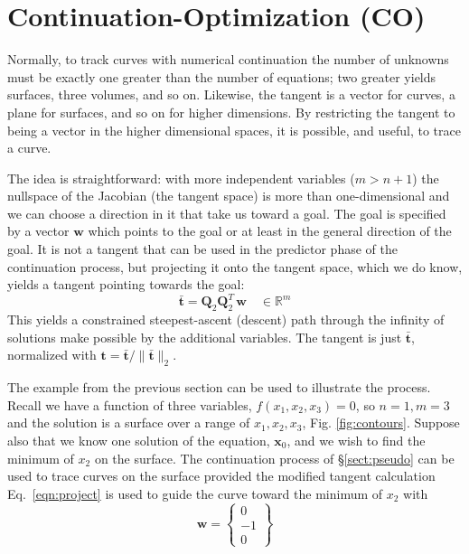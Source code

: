 \documentclass[10pt,openany,twoside]{book}
\numberwithin{equation}{section}   %
\newcommand{\Matrix}[1]{\boldsymbol{#1}}
\newcommand{\Vector}[1]{\boldsymbol{#1}}
\newcommand{\Sectref}[1]{\S\ref{#1}}
\newcommand{\Eqn}[1]{Eq.\ \ref{#1}}
\newcommand{\Figref}[1]{Fig. \ref{#1}}
\begin{document}
\section{Continuation-Optimization (CO)}\label{sect:CO}
Normally, to track curves with numerical continuation the number of unknowns
must be exactly one greater than the number of equations; two greater
yields surfaces, three volumes, and so on. Likewise, the tangent is a
vector for curves, a plane for surfaces, and so on for higher dimensions.
By restricting the tangent to being a vector in the higher dimensional
spaces, it is possible, and useful, to trace a curve.

The idea is straightforward: with more independent variables ($m > n+1$)
the nullspace of the Jacobian (the tangent space) is more than
one-dimensional and we can choose a direction in it that take us
toward a goal. The goal is specified by a vector $\Vector{w}$ which
points to the goal or at least in the general direction of the goal. 
It is not a tangent that can be used in the predictor phase of the
continuation process, but projecting it onto the tangent space, which
we do know, yields a tangent pointing towards the goal:
\begin{equation} \label{eqn:project}
\bar{\Vector{t}} = \Matrix{Q}_2\Matrix{Q}_2^T\,\Vector{w} \quad \in \mathbb{R}^m
\end{equation}
This yields a constrained steepest-ascent (descent) path through the
infinity of solutions make possible by the additional variables.
The tangent is just $\bar{\Vector{t}}$, normalized with
$\Vector{t} = \bar{\Vector{t}}/\|\bar{\Vector{t}}\|_2$.

The example from the previous section can be used to illustrate the process.
Recall we have a function of three variables, $f(x_1,x_2,x_3) = 0$, so
$n = 1, m = 3$ and the solution is a surface over a range of $x_1, x_2, x_3$,
\Figref{fig:contours}.
Suppose also that we know one solution of the equation, $\Vector{x}_0$,
and we wish to find the minimum of $x_2$ on the surface.
The continuation process of \Sectref{sect:pseudo} can be used to trace
curves on the surface provided the modified tangent calculation \Eqn{eqn:project}
is used to guide the curve toward the minimum of $x_2$ with
\begin{equation*}
	\Vector{w} = \left\{\begin{array}{c}
			0 \\
			-1 \\
			0
		\end{array}\right\}
\end{equation*}
\end{document}
